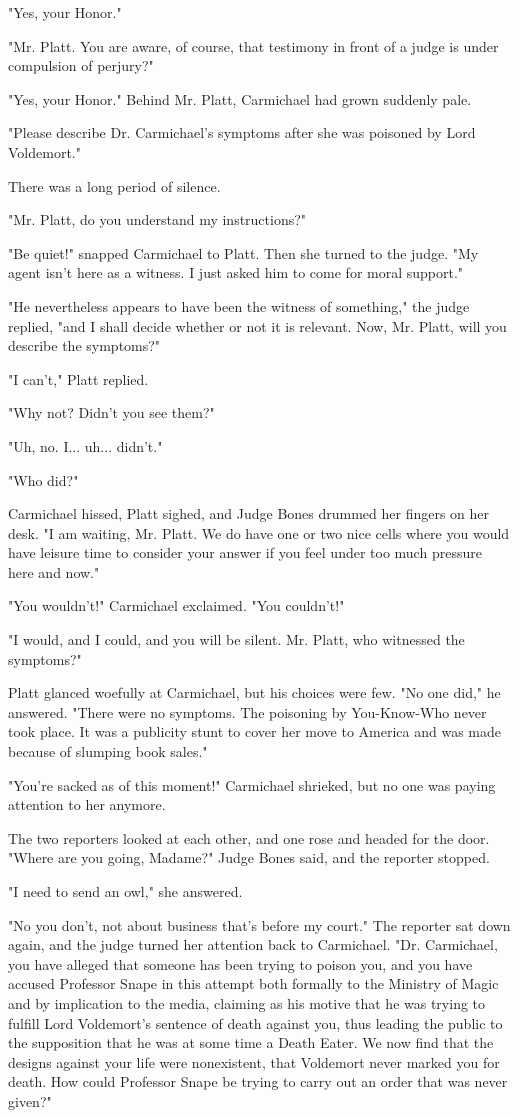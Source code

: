 \documentclass[a4paper,11pt]{article}
\begin{document}
"Yes, your Honor."

"Mr. Platt. You are aware, of course, that testimony in front of a judge is under compulsion of perjury?"

"Yes, your Honor." Behind Mr. Platt, Carmichael had grown suddenly pale.

"Please describe Dr. Carmichael's symptoms after she was poisoned by Lord Voldemort."

There was a long period of silence.

"Mr. Platt, do you understand my instructions?"

"Be quiet!" snapped Carmichael to Platt. Then she turned to the judge. "My agent isn't here as a witness. I just asked him to come for moral support."

"He nevertheless appears to have been the witness of something," the judge replied, "and I shall decide whether or not it is relevant. Now, Mr. Platt, will you describe the symptoms?"

"I can't," Platt replied.

"Why not? Didn't you see them?"

"Uh, no. I... uh... didn't."

"Who did?"

Carmichael hissed, Platt sighed, and Judge Bones drummed her fingers on her desk. "I am waiting, Mr. Platt. We do have one or two nice cells where you would have leisure time to consider your answer if you feel under too much pressure here and now."

"You wouldn't!" Carmichael exclaimed. "You couldn't!"

"I would, and I could, and you will be silent. Mr. Platt, who witnessed the symptoms?"

Platt glanced woefully at Carmichael, but his choices were few. "No one did," he answered. "There were no symptoms. The poisoning by You-Know-Who never took place. It was a publicity stunt to cover her move to America and was made because of slumping book sales."

"You're sacked as of this moment!" Carmichael shrieked, but no one was paying attention to her anymore.

The two reporters looked at each other, and one rose and headed for the door. "Where are you going, Madame?" Judge Bones said, and the reporter stopped.

"I need to send an owl," she answered.

"No you don't, not about business that's before my court." The reporter sat down again, and the judge turned her attention back to Carmichael. "Dr. Carmichael, you have alleged that someone has been trying to poison you, and you have accused Professor Snape in this attempt both formally to the Ministry of Magic and by implication to the media, claiming as his motive that he was trying to fulfill Lord Voldemort's sentence of death against you, thus leading the public to the supposition that he was at some time a Death Eater. We now find that the designs against your life were nonexistent, that Voldemort never marked you for death. How could Professor Snape be trying to carry out an order that was never given?"
\end{document}
